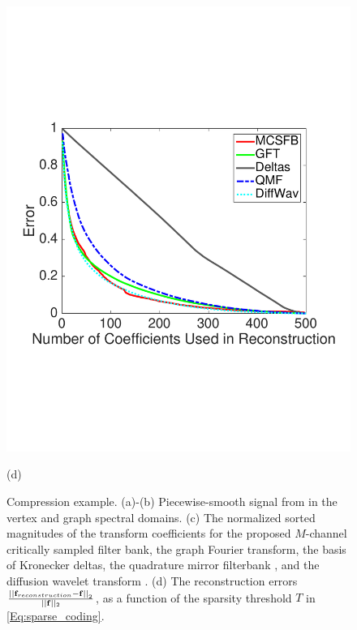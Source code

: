 \documentclass[journal, 10pt]{IEEEtran}
\begin{document}
\begin{figure}[tbh]
\begin{minipage}[m]{0.48\linewidth}
\centerline{\includegraphics[width=.98\linewidth]{fig_comp_error}}
\centerline{\small{(d)}}
\end{minipage}
\caption{Compression example. (a)-(b) Piecewise-smooth signal from \cite[Fig. 11]{shuman_TSP_multiscale} in the vertex and graph spectral domains. (c) The normalized sorted magnitudes of the transform coefficients for the proposed $M$-channel critically sampled filter bank, the graph Fourier transform, the basis of Kronecker deltas, the quadrature mirror filterbank \cite{narang2012perfect}, and the diffusion wavelet transform \cite{coifman2006diffusion}. (d) The reconstruction errors  $\frac{\left|\left|{\bf f}_{\mbox{reconstruction}}-{\bf f}\right|\right|_2}{||{\bf f}||_2}$, as a function of the sparsity threshold $T$ in \eqref{Eq:sparse_coding}.} \label{Fig:comp}
\end{figure}
\end{document}
